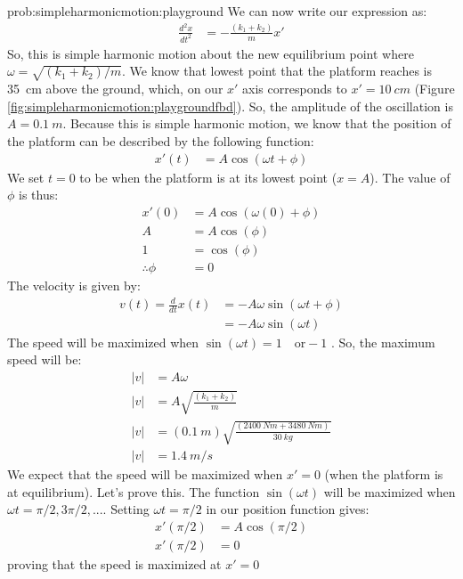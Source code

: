 \begin{solution}{prob:simpleharmonicmotion:playground}
We can now write our expression as:
\begin{align*}
\frac{d^2x}{dt^2}&=-\frac{(k_1+k_2)}{m}x'
\end{align*}
So, this is simple harmonic motion about the new equilibrium point where $\omega=\sqrt{(k_1+k_2)/m}$. We know that lowest point that the platform reaches is \SI{35}{cm} above the ground, which, on our $x'$ axis corresponds to $x'=\SI{10}{cm}$ (Figure \ref{fig:simpleharmonicmotion:playgroundfbd}). So, the amplitude of the oscillation is $A=\SI{0.1}{m}$. Because this is simple harmonic motion, we know that the position of the platform can be described by the following function:
\begin{align*}
x'(t)&= A \cos(\omega t + \phi)
\end{align*}
We set $t=0$ to be when the platform is at its lowest point ($x=A$). The value of $\phi$ is thus:
\begin{align*}
x'(0)&= A \cos(\omega (0) + \phi)\\
A&= A \cos(\phi)\\
1&=\cos(\phi)\\
\therefore \phi&=0
\end{align*}
The velocity is given by:
\begin{align*}
v(t)=\frac{d}{dt}x(t) &= -A\omega\sin(\omega t + \phi)\\
&=-A\omega\sin(\omega t)
\end{align*}
The speed will be maximized when $\sin(\omega t)=1\quad \textrm{or} -1$ . So, the maximum speed will be:
\begin{align*}
|v|&=A\omega\\
|v|&=A\sqrt{\frac{(k_1+k_2)}{m}}\\
|v|&=(\SI{0.1}{m})\sqrt{\frac{(\SI{2400}{Nm}+\SI{3480}{Nm})}{\SI{30}{kg}}}\\
|v|&=\SI{1.4}{m/s}
\end{align*}
We expect that the speed will be maximized when $x'=0$ (when the platform is at equilibrium). Let's prove this. The function $\sin(\omega t)$ will be maximized when $\omega t=\pi/2, 3\pi/2,...$. Setting $\omega t=\pi/2$ in our position function gives:
\begin{align*}
x'(\pi/2)&= A \cos(\pi/2)\\
x'(\pi/2)&= 0
\end{align*}
proving that the speed is maximized at $x'=0$
\end{solution}

